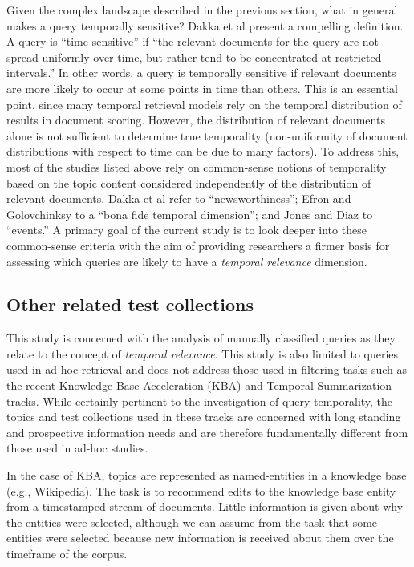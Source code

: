 \documentclass{asist}
\begin{document}
Given the complex landscape described in the previous section, what in general makes a query temporally sensitive? Dakka et al \cite{Dakka2012} present a compelling definition. A query is ``time sensitive''  if  ``the relevant documents for the query are not spread uniformly over time, but rather tend to be concentrated at restricted intervals.''  In other words, a query is temporally sensitive if relevant documents are more likely to occur at some points in time than others. This is an essential point, since many temporal retrieval models rely on the temporal distribution of results in document scoring. However, the distribution of relevant documents alone is not sufficient to determine true temporality (non-uniformity of document distributions with respect to time can be due to many factors). To address this, most of the studies listed above rely on common-sense notions of temporality based on the topic content considered independently of the distribution of relevant documents. Dakka et al refer to ``newsworthiness''; Efron and Golovchinksy to a ``bona fide temporal dimension''; and Jones and Diaz to ``events.''  A primary goal of the current study is to look deeper into these common-sense criteria with the aim of providing researchers a firmer basis for assessing which queries are likely to have a \emph{temporal relevance} dimension.


\subsection{Other related test collections}

This study is concerned with the analysis of manually classified queries as they relate to the concept of \emph{temporal relevance}. This study is also limited to queries used in ad-hoc retrieval and does not address those used in filtering tasks such as the recent Knowledge Base Acceleration (KBA) \cite{Frank2013} and Temporal Summarization \cite{Guo2013} tracks.  While certainly pertinent to the investigation of query temporality, the topics and test collections used in these tracks are concerned with long standing and prospective information needs and are therefore fundamentally different from those used in ad-hoc studies. 

In the case of KBA, topics are represented as named-entities in a knowledge base (e.g., Wikipedia). The task is to recommend edits to the knowledge base entity from a timestamped stream of documents.  Little information is given about why the entities were selected, although we can assume from the task that some entities were selected because new information is received about them over the timeframe of the corpus. 
\end{document}
